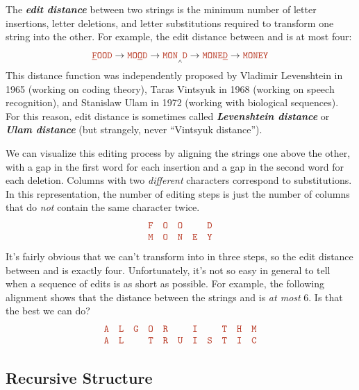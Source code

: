 The \textbf{\textit{edit distance}} between two strings is the minimum number of letter insertions, letter deletions, and letter substitutions required to transform one string into the other.
For example, the edit distance between  and  is at most four:
\[
\mbox{\Str{\underline{F}OOD}} \to \mbox{\Str{MO\underline{O}D}} \to \mbox{\Str{MON}\raisebox{-1.1ex}{$\scriptscriptstyle\wedge$}\Str{D}} \to \mbox{\Str{MONE\underline{D}}} \to \mbox{\Str{MONEY}}
\]
This distance function was independently proposed by Vladimir Levenshtein in 1965 (working on coding theory), Taras Vintsyuk in 1968 (working on speech recognition), and Stanislaw Ulam in 1972 (working with biological sequences).
For this reason, edit distance is sometimes called \textbf{\textit{Levenshtein distance}} or \textbf{\textit{Ulam distance}} (but strangely, never “Vintsyuk distance”).

We can visualize this editing process by aligning the strings one above the other, with a gap in the first word for each insertion and a gap in the second word for each deletion.
Columns with two \textit{different} characters correspond to substitutions.
In this representation, the number of editing steps is just the number of columns that do \textit{not} contain the same character twice.
\[
\begin{array}{ccccc}
\mbox{\Str{F}} & \mbox{\Str{O}} & \mbox{\Str{O}} & & \mbox{\Str{D}}\\
\mbox{\Str{M}} & \mbox{\Str{O}} & \mbox{\Str{N}} & \mbox{\Str{E}} & \mbox{\Str{Y}}
\end{array}
\]
It’s fairly obvious that we can’t transform  into  in three steps, so the edit distance between  and  is exactly four.
Unfortunately, it’s not so easy in general to tell when a sequence of edits is as short as possible.
For example, the following alignment shows that the distance between the strings  and  is \textit{at most} 6.
Is that the best we can do?
\[
\begin{array}{ccccccccccc}
\mbox{\Str{A}} & \mbox{\Str{L}} & \mbox{\Str{G}} & \mbox{\Str{O}} & \mbox{\Str{R}} & & \mbox{\Str{I}} & & \mbox{\Str{T}} & \mbox{\Str{H}} & \mbox{\Str{M}}\\
\mbox{\Str{A}} & \mbox{\Str{L}} & & \mbox{\Str{T}} & \mbox{\Str{R}} & \mbox{\Str{U}} & \mbox{\Str{I}} & \mbox{\Str{S}} & \mbox{\Str{T}} & \mbox{\Str{I}} & \mbox{\Str{C}}
\end{array}
\]

\subsection{Recursive Structure}


